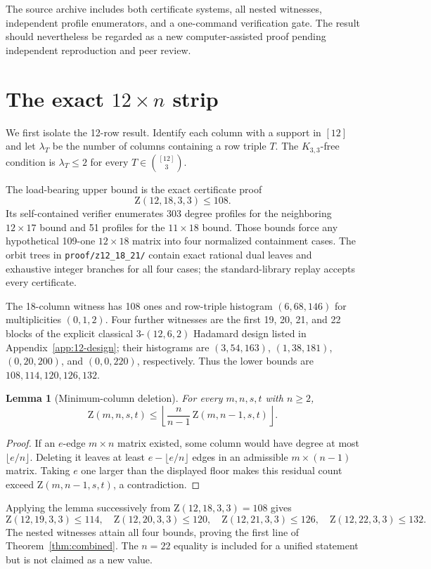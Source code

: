 \documentclass[10pt,a4paper]{amsart}
\newtheorem{lemma}[theorem]{Lemma}
\newcommand{\Z}{\mathrm Z}
\begin{document}
The source archive includes both certificate systems, all nested witnesses, independent profile enumerators, and a one-command verification gate. The result should nevertheless be regarded as a new computer-assisted proof pending independent reproduction and peer review.

\section{The exact $12\times n$ strip}
\label{sec:12-strip}

We first isolate the 12-row result. Identify each column with a support in
$[12]$ and let $\lambda_T$ be the number of columns containing a row triple
$T$. The $K_{3,3}$-free condition is $\lambda_T\le2$ for every
$T\in\binom{[12]}3$.

The load-bearing upper bound is the exact certificate proof
\[
  \Z(12,18,3,3)\le108.
\]
Its self-contained verifier enumerates 303 degree profiles for the neighboring
$12\times17$ bound and 51 profiles for the $11\times18$ bound. Those bounds
force any hypothetical 109-one $12\times18$ matrix into four normalized
containment cases. The orbit trees in \texttt{proof/z12\_18\_21/} contain exact
rational dual leaves and exhaustive integer branches for all four cases; the
standard-library replay accepts every certificate.

The 18-column witness has 108 ones and row-triple histogram
$(6,68,146)$ for multiplicities $(0,1,2)$. Four further witnesses are the
first 19, 20, 21, and 22 blocks of the explicit classical 3-$(12,6,2)$
Hadamard design listed in Appendix~\ref{app:12-design}; their histograms are
$(3,54,163)$, $(1,38,181)$, $(0,20,200)$, and $(0,0,220)$, respectively.
Thus the lower bounds are $108,114,120,126,132$.

\begin{lemma}[Minimum-column deletion]
\label{lem:min-column}
For every $m,n,s,t$ with $n\ge2$,
\[
  \Z(m,n,s,t)\le
  \left\lfloor\frac{n}{n-1}\,\Z(m,n-1,s,t)\right\rfloor.
\]
\end{lemma}
\begin{proof}
If an $e$-edge $m\times n$ matrix existed, some column would have degree at
most $\lfloor e/n\rfloor$. Deleting it leaves at least
$e-\lfloor e/n\rfloor$ edges in an admissible $m\times(n-1)$ matrix. Taking
$e$ one larger than the displayed floor makes this residual count exceed
$\Z(m,n-1,s,t)$, a contradiction.
\end{proof}

Applying the lemma successively from $\Z(12,18,3,3)=108$ gives
\[
\Z(12,19,3,3)\le114,\quad
\Z(12,20,3,3)\le120,\quad
\Z(12,21,3,3)\le126,\quad
\Z(12,22,3,3)\le132.
\]
The nested witnesses attain all four bounds, proving the first line of
Theorem~\ref{thm:combined}. The $n=22$ equality is included for a unified
statement but is not claimed as a new value.
\end{document}
